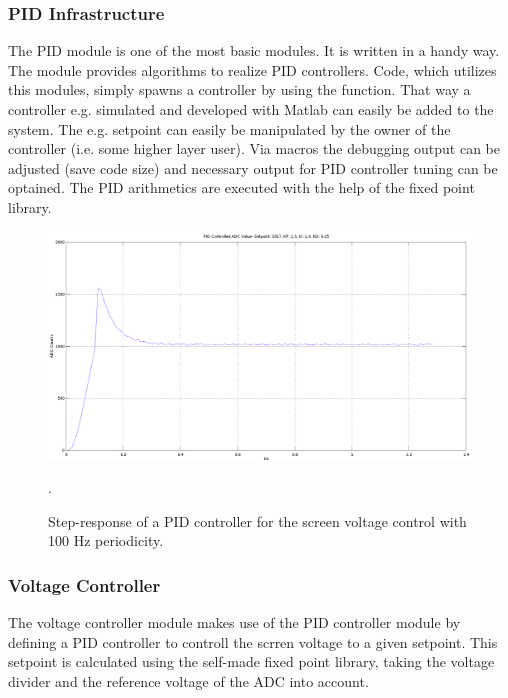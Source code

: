 \subsubsection{PID Infrastructure}
The PID module is one of the most basic modules. It is written in a handy way.
The module provides algorithms to realize PID controllers. Code, which utilizes
this modules, simply spawns a controller by using the
 function. That way a
controller e.g. simulated and developed with Matlab can easily be added to the
system. The e.g. setpoint can easily be manipulated by the owner of the
controller (i.e. some higher layer user). Via macros the debugging output can be
adjusted (save code size) and necessary output for PID controller tuning can be
optained. The PID arithmetics are executed with the help of the fixed point
library.
\begin{figure}[H]
	\centering
	\label{fig:pid}
	\includegraphics[width=1\textwidth]{./fig/pid_12v_100Hz.png}
	\caption{Step-response of a PID controller for the screen voltage
	control with 100 Hz periodicity.}.
\end{figure}

\subsubsection{Voltage Controller}
The voltage controller module makes use of the PID controller module by defining
a PID controller to controll the scrren voltage to a given setpoint. This setpoint is calculated using the self-made fixed point library, taking the voltage divider
and the reference voltage of the ADC into account.

